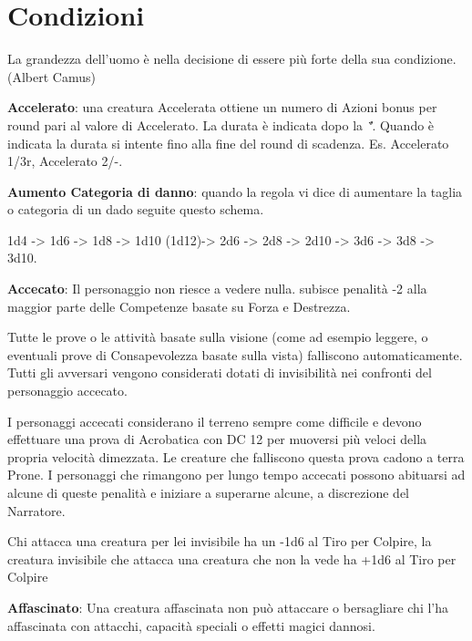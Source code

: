 \section{Condizioni}

\begin{enfasi}
La grandezza dell'uomo è nella decisione di essere più forte della sua condizione. (Albert Camus)
\end{enfasi}

\begin{multicols}{2}

\label{condizioni}

\textbf{Accelerato}\hypertarget{Accelerato}{}\label{Accelerato}: una creatura Accelerata ottiene un numero di Azioni bonus per round pari al valore di Accelerato. La durata è indicata dopo la \emph{"\"}. Quando è indicata la durata si intente fino alla fine del round di scadenza. Es. Accelerato 1/3r, Accelerato 2/-.

\textbf{Aumento Categoria di danno}: quando la regola vi dice di aumentare la taglia o categoria di un dado seguite questo schema.

1d4 -> 1d6 -> 1d8 -> 1d10 (1d12)-> 2d6 -> 2d8 -> 2d10 -> 3d6 -> 3d8 -> 3d10.

\textbf{Accecato}: Il personaggio non riesce a vedere nulla. subisce penalità -2 alla maggior parte delle Competenze basate su Forza e Destrezza.

Tutte le prove o le attività basate sulla visione (come ad esempio leggere, o eventuali prove di Consapevolezza basate sulla vista) falliscono automaticamente. Tutti gli avversari vengono considerati dotati di invisibilità nei confronti del personaggio accecato.

I personaggi accecati considerano il terreno sempre come difficile e devono effettuare una prova di Acrobatica con DC 12 per muoversi più veloci della propria velocità dimezzata. Le creature che falliscono questa prova cadono a terra Prone. I personaggi che rimangono per lungo tempo accecati possono abituarsi ad alcune di queste penalità e iniziare a superarne alcune, a discrezione del Narratore.

Chi attacca una creatura per lei invisibile ha un -1d6 al Tiro per Colpire, la creatura invisibile che attacca una creatura che non la vede ha +1d6 al Tiro per Colpire

\textbf{Affascinato}: Una creatura affascinata non può attaccare o bersagliare chi l'ha affascinata con attacchi, capacità speciali o effetti magici dannosi.


\end{multicols}

